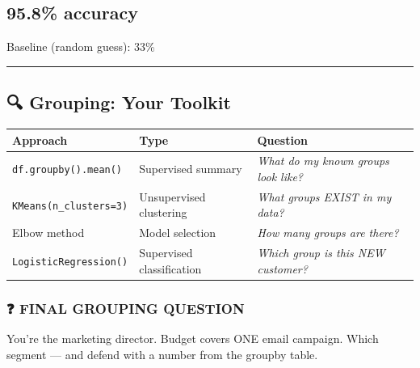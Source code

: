 \documentclass[
]{article}
\begin{document}
\subsection{\texorpdfstring{\textbf{95.8\%}
accuracy}{95.8\% accuracy}}\label{accuracy}

{Baseline (random guess): 33\%}

\begin{center}\rule{0.5\linewidth}{0.5pt}\end{center}

\subsection{🔍 Grouping: Your Toolkit}\label{grouping-your-toolkit}

\begin{longtable}[]{@{}
  >{\raggedright\arraybackslash}p{}
  >{\raggedright\arraybackslash}p{}
  >{\raggedright\arraybackslash}p{}@{}}
\toprule\noalign{}
\begin{minipage}[b]{\linewidth}\raggedright
Approach
\end{minipage} & \begin{minipage}[b]{\linewidth}\raggedright
Type
\end{minipage} & \begin{minipage}[b]{\linewidth}\raggedright
Question
\end{minipage} \\
\midrule\noalign{}
\endhead
\bottomrule\noalign{}
\endlastfoot
\texttt{df.groupby().mean()} & Supervised summary & \emph{What do my
known groups look like?} \\
\texttt{KMeans(n\_clusters=3)} & Unsupervised clustering & \emph{What
groups EXIST in my data?} \\
Elbow method & Model selection & \emph{How many groups are there?} \\
\texttt{LogisticRegression()} & Supervised classification & \emph{Which
group is this NEW customer?} \\
\end{longtable}

\subsubsection{❓ FINAL GROUPING
QUESTION}\label{final-grouping-question}

You're the marketing director. Budget covers ONE email campaign. Which
segment --- and defend with a number from the groupby table.
\end{document}
